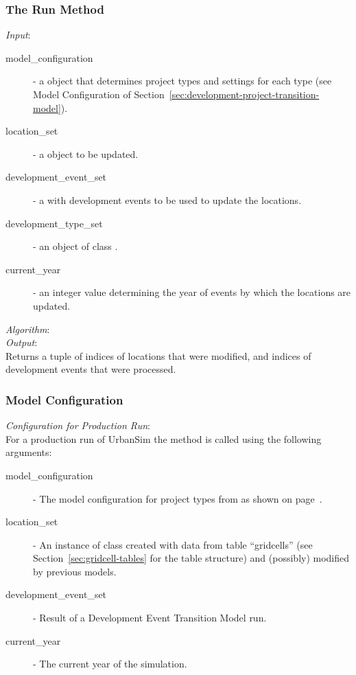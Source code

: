 \subsubsection{The Run Method}
%
{\it Input}:
\begin{description}
\item[model_configuration] - a  object that determines
  project types and settings for each type (see Model Configuration of
  Section~\ref{sec:development-project-transition-model}).
\item[location_set] - a  object to be updated.
\item[development_event_set] - a  with development
  events to be used to update the locations.
\item[development_type_set] - an object of class .
\item[current_year] - an integer value determining the year of events by
  which the locations are updated.
\end{description}

{\it Algorithm}:\\[1mm]


{\it Output}:~\\[1mm]
Returns a tuple of indices of locations that were modified, and indices of
development events that were processed.

\subsubsection{Model Configuration}
\modelsindex
%
{\em Configuration for Production Run}:\\[1mm]
For a production run of UrbanSim the method  is called using the
following arguments:
\begin{description}
\item[model_configuration] - The model configuration for project types from
   as shown on page~\pageref{page:model-configuration}.
\item[location_set] - An instance of class  created with
  data from table ``gridcells'' (see Section~\ref{sec:gridcell-tables} for the
  table structure) and (possibly) modified by previous models. 
\item[development_event_set] - Result of a Development Event Transition Model 
  run.
\item[current_year] - The current year of the simulation.
\end{description}


